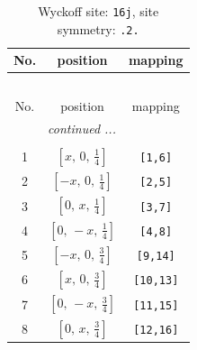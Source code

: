 \documentclass[fleqn,8pt]{jsarticle}
\begin{document}
\begin{longtable}{ccc}
\caption{Wyckoff site: {\tt 16j}, site symmetry: {\tt .2.}}
 \\
 \hline \hline
No. & position & mapping \\ \hline \endfirsthead

\multicolumn{2}{l}{\tablename\ \thetable{}} \\
 \hline \hline
No. & position & mapping \\ \hline \endhead

 \hline \hline
\multicolumn{2}{r}{\footnotesize\it continued ...} \\ \endfoot

 \hline \hline
\multicolumn{2}{r}{} \\ \endlastfoot

1 & $\left[ x,\, 0,\, \frac{1}{4} \right]$ & {\tt [1,6]} \\ \hline
2 & $\left[ - x,\, 0,\, \frac{1}{4} \right]$ & {\tt [2,5]} \\ \hline
3 & $\left[ 0,\, x,\, \frac{1}{4} \right]$ & {\tt [3,7]} \\ \hline
4 & $\left[ 0,\, - x,\, \frac{1}{4} \right]$ & {\tt [4,8]} \\ \hline
5 & $\left[ - x,\, 0,\, \frac{3}{4} \right]$ & {\tt [9,14]} \\ \hline
6 & $\left[ x,\, 0,\, \frac{3}{4} \right]$ & {\tt [10,13]} \\ \hline
7 & $\left[ 0,\, - x,\, \frac{3}{4} \right]$ & {\tt [11,15]} \\ \hline
8 & $\left[ 0,\, x,\, \frac{3}{4} \right]$ & {\tt [12,16]} \\
\end{longtable}
\renewcommand{\arraystretch}{1.2}
\end{document}
